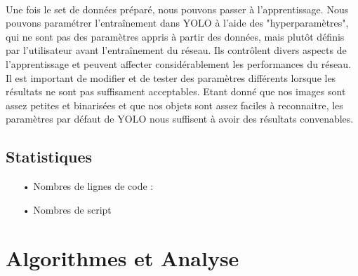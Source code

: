 \documentclass[a4paper]{article}
\begin{document}
			\paragraph{} Une fois le set de données préparé, nous pouvons passer à l'apprentissage.
			Nous pouvons paramétrer l'entraînement dans YOLO à l'aide des "hyperparamètres", qui ne sont pas des paramètres appris à partir des données, mais plutôt définis par l'utilisateur avant l'entraînement du réseau. Ils contrôlent divers aspects de l'apprentissage et peuvent affecter considérablement les performances du réseau.
			Il est important de modifier et de tester des paramètres différents lorsque les résultats ne sont pas suffisament acceptables.
			Etant donné que nos images sont assez petites et binarisées et que nos objets sont assez faciles à reconnaitre, les paramètres par défaut de YOLO nous suffisent à avoir des résultats convenables.



			\subsection{Statistiques}
			\begin{itemize}
				\item[•] Nombres de lignes de code : 
				\item[•] Nombres de script
			\end{itemize}
	
	\newpage

	
	\section{Algorithmes et Analyse}
\end{document}
